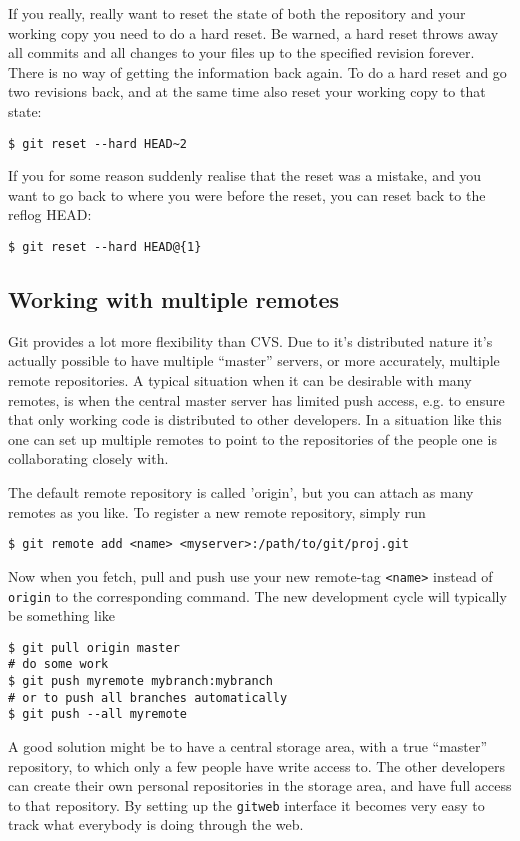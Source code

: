 \documentclass[a4paper,10pt]{article}
\begin{document}
If you really, really want to reset the state of both the repository and your
working copy you need to do a hard reset. Be warned, a hard reset throws away
all commits and all changes to your files up to the specified revision forever. 
There is no way of getting the information back again. To do a hard reset and
go two revisions back, and at the same time also reset your working copy to
that state:
\begin{verbatim}
$ git reset --hard HEAD~2
\end{verbatim}
If you for some reason suddenly realise that the reset was a mistake, and you
want to go back to where you were before the reset, you can 
reset back to the reflog HEAD:
\begin{verbatim}
$ git reset --hard HEAD@{1}
\end{verbatim}


\subsection{Working with multiple remotes}
\label{sec:remotes}
Git provides a lot more flexibility than CVS. Due to it's distributed nature
it's actually possible to have multiple ``master'' servers, or more
accurately, multiple remote repositories. 
A typical situation when it can be desirable with many remotes, is when the
central master server has limited push access, e.g. to ensure that only
working code is distributed to other developers. In a situation like this one
can set up multiple remotes to point to the repositories of the
people one is collaborating closely with.

The default remote repository is
called 'origin', but you can attach as many remotes as you like. To register a
new remote repository, simply run
\begin{verbatim}
$ git remote add <name> <myserver>:/path/to/git/proj.git
\end{verbatim}

Now when you fetch, pull and push use your new remote-tag {\tt <name>} instead 
of {\tt origin} to the corresponding command. The new development cycle will
typically be something like
\begin{verbatim}
$ git pull origin master
# do some work
$ git push myremote mybranch:mybranch
# or to push all branches automatically
$ git push --all myremote 
\end{verbatim}

A good solution might be to have a central storage area, with a true ``master'' 
repository, to which only a few people have write access to. The other
developers can create their own personal repositories in the storage area, and
have full access to that repository. By setting up the \texttt{gitweb}
interface it becomes very easy to track what everybody is doing through 
the web.
\end{document}
